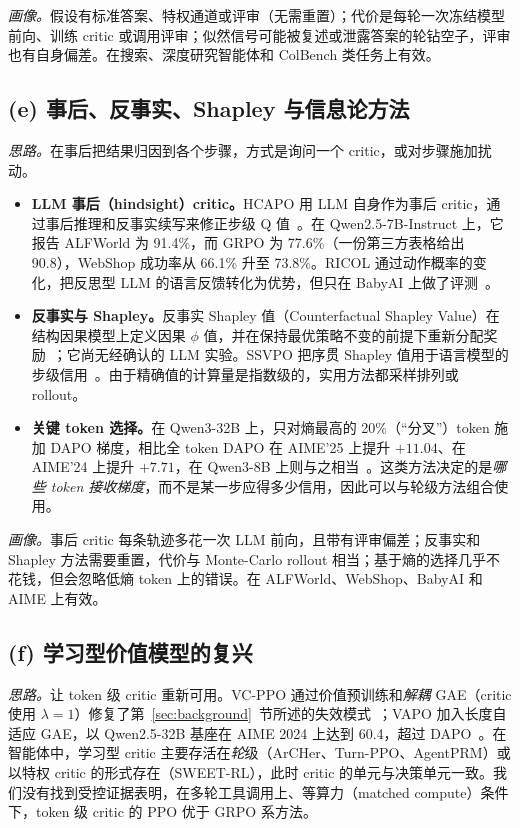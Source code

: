 \emph{画像。}假设有标准答案、特权通道或评审（无需重置）；代价是每轮一次冻结模型前向、训练 critic 或调用评审；似然信号可能被复述或泄露答案的轮钻空子，评审也有自身偏差。在搜索、深度研究智能体和 ColBench 类任务上有效。

\subsection{(e) 事后、反事实、Shapley 与信息论方法}\label{sec:tax-hindsight}

\emph{思路。}在事后把结果归因到各个步骤，方式是询问一个 critic，或对步骤施加扰动。
\begin{itemize}
  \item \textbf{LLM 事后（hindsight）critic。}HCAPO 用 LLM 自身作为事后 critic，通过事后推理和反事实续写来修正步级 Q 值~\citep{tan2026hindsight}。在 Qwen2.5-7B-Instruct 上，它报告 ALFWorld 为 91.4\%，而 GRPO 为 77.6\%（一份第三方表格给出 90.8），WebShop 成功率从 66.1\% 升至 73.8\%。RICOL 通过动作概率的变化，把反思型 LLM 的语言反馈转化为优势，但只在 BabyAI 上做了评测~\citep{chen2026retrospective}。
  \item \textbf{反事实与 Shapley。}反事实 Shapley 值（Counterfactual Shapley Value）在结构因果模型上定义因果 $\phi$ 值，并在保持最优策略不变的前提下重新分配奖励~\citep{li2026counterfactual}；它尚无经确认的 LLM 实验。SSVPO 把序贯 Shapley 值用于语言模型的步级信用~\citep{ssvpo2026effective}\unverified。由于精确值的计算量是指数级的，实用方法都采样排列或 rollout。
  \item \textbf{关键 token 选择。}在 Qwen3-32B 上，只对熵最高的 20\%（“分叉”）token 施加 DAPO 梯度，相比全 token DAPO 在 AIME'25 上提升 $+11.04$、在 AIME'24 上提升 $+7.71$，在 Qwen3-8B 上则与之相当~\citep{wang2025beyond}。这类方法决定的是\emph{哪些 token 接收梯度}，而不是某一步应得多少信用，因此可以与轮级方法组合使用。
\end{itemize}

\emph{画像。}事后 critic 每条轨迹多花一次 LLM 前向，且带有评审偏差；反事实和 Shapley 方法需要重置，代价与 Monte-Carlo rollout 相当；基于熵的选择几乎不花钱，但会忽略低熵 token 上的错误。在 ALFWorld、WebShop、BabyAI 和 AIME 上有效。

\subsection{(f) 学习型价值模型的复兴}\label{sec:tax-value}

\emph{思路。}让 token 级 critic 重新可用。VC-PPO 通过价值预训练和\emph{解耦} GAE（critic 使用 $\lambda=1$）修复了第~\ref{sec:background}~节所述的失效模式~\citep{yuan2025whats}；VAPO 加入长度自适应 GAE，以 Qwen2.5-32B 基座在 AIME 2024 上达到 60.4，超过 DAPO~\citep{yue2025vapo}。在智能体中，学习型 critic 主要存活在\emph{轮}级（ArCHer、Turn-PPO、AgentPRM）或以特权 critic 的形式存在（SWEET-RL），此时 critic 的单元与决策单元一致。我们没有找到受控证据表明，在多轮工具调用上、等算力（matched compute）条件下，token 级 critic 的 PPO 优于 GRPO 系方法。


